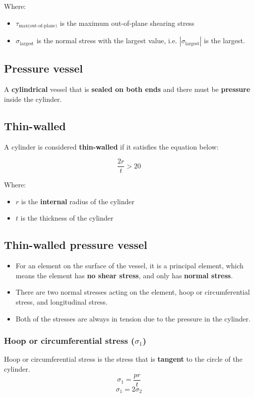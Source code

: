 \documentclass[11pt]{article}
\begin{document}
Where:
\begin{itemize}
\item \(\tau_{\text{max(out-of-plane)}}\) is the maximum out-of-plane shearing stress
\item \(\sigma_{\text{largest}}\) is the normal stress with the largest value, i.e. \(|\sigma_{\text{largest}}|\) is the largest.
\end{itemize}
\subsection{Pressure vessel}
\label{sec:orgfdf63e3}
A \textbf{cylindrical} vessel that is \textbf{sealed on both ends} and there must be \textbf{pressure} inside the cylinder.
\subsection{Thin-walled}
\label{sec:orga212817}
A cylinder is considered \textbf{thin-walled} if it satisfies the equation below:

\[\frac{2r}{t} > 20\]

Where:
\begin{itemize}
\item \(r\) is the \textbf{internal} radius of the cylinder
\item \(t\) is the thickness of the cylinder
\end{itemize}
\subsection{Thin-walled pressure vessel}
\label{sec:org343c7ff}
\begin{itemize}
\item For an element on the surface of the vessel, it is a principal element, which means the element has \textbf{no shear stress}, and only has \textbf{normal stress}.
\item There are two normal stresses acting on the element, hoop or circumferential stress, and longitudinal stress.
\item Both of the stresses are always in tension due to the pressure in the cylinder.
\end{itemize}
\subsubsection{Hoop or circumferential stress (\(\sigma_1\))}
\label{sec:orgec7f811}
Hoop or circumferential stress is the stress that is \textbf{tangent} to the circle of the cylinder.
\[\sigma_1 = \frac{pr}{t}\]
\[\sigma_1 = 2 \sigma_2\]
\end{document}
